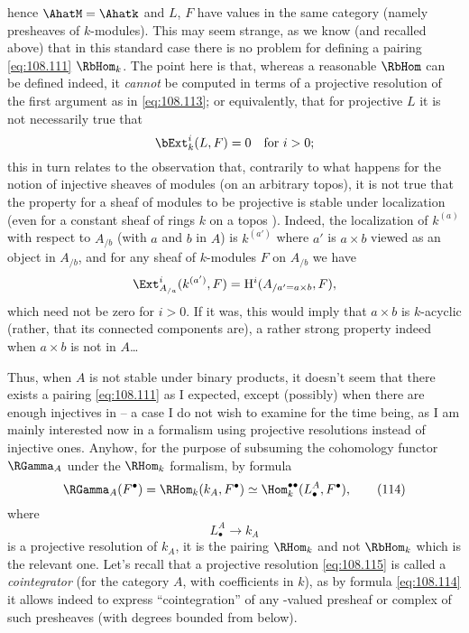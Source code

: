 hence $\AhatM=\Ahatk$ and $L$, $F$ have values in the same category
(namely presheaves of $k$-modules). This may seem strange, as we know
(and recalled above) that in this standard case there is no problem
for defining a pairing \eqref{eq:108.111} $\RbHom_k$. The
point here is that, whereas a reasonable $\RbHom$ can be defined
indeed, it \emph{cannot} be computed in terms of a projective
resolution of the first argument as in \eqref{eq:108.113}; or
equivalently, that for projective $L$ it is not necessarily true that
\[\bExt_k^i(L,F)=0\quad\text{for $i>0$;}\]
this in turn relates to the observation that, contrarily to what
happens for the notion of injective sheaves of modules (on an
arbitrary topos), it is not true that the property for a sheaf of
modules to be projective is stable under localization (even for
a constant sheaf of rings $k$ on a topos \Ahat). Indeed, the
localization of $k^{(a)}$ with respect to $A_{/b}$ (with $a$ and $b$
in $A$) is $k^{(a')}$ where $a'$ is $a\times b$ viewed as an object in
$A_{/b}$, and for any sheaf of $k$-modules $F$ on $A_{/b}$ we have
\[\Ext_{A_{/a}}^i(k^{(a')},F) = \mathrm H^i(A_{/a'=a\times b},F),\]
which need not be zero for $i>0$. If it was, this would imply that
$a\times b$ is $k$-acyclic (rather, that its connected components
are), a rather strong property indeed when $a\times b$ is not in
$A$\ldots

Thus, when $A$ is not stable under binary products, it doesn't seem
that there exists a pairing \eqref{eq:108.111} as I expected, except
(possibly) when there are enough injectives in \AhatM{} -- a case I do
not wish to examine for the time being, as I am mainly interested now
in a formalism using projective resolutions instead of injective
ones. Anyhow, for the purpose of subsuming the cohomology functor
$\RGamma_A$ under the $\RHom_k$ formalism, by formula
\begin{equation}
  \label{eq:108.114}
  \RGamma_A(F^\bullet) = \RHom_k(k_A,F^\bullet) \simeq
  \Hom_k^{\bullet\bullet}(L_\bullet^A,F^\bullet),\tag{114}
\end{equation}
where
\begin{equation}
  \label{eq:108.115}
  L_\bullet^A\to k_A\tag{115}
\end{equation}
is a projective resolution of $k_A$, it is the pairing $\RHom_k$ and
not $\RbHom_k$ which is the relevant one. Let's recall that a
projective resolution \eqref{eq:108.115} is called a
\emph{cointegrator} (for the category $A$, with coefficients in $k$),
as by formula \eqref{eq:108.114} it allows indeed to express
``cointegration'' of any \scrM-valued presheaf or complex of such
presheaves (with degrees bounded from below).

